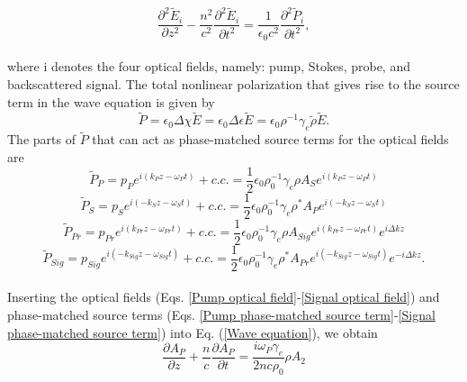 \documentclass[sn-nature]{sn-jnl}%
\begin{document}
\begin{equation}
    \frac{\partial^{2}\tilde{E}_{i}}{\partial z^{2}} - \frac{n^{2}}{c^{2}}\frac{\partial^{2}\tilde{E}_{i}}{\partial t^{2}} = \frac{1}{\epsilon_{0}c^{2}}\frac{\partial^{2}\tilde{P}_{i}}{\partial t^{2}},
    \label{Wave equation}
\end{equation}
\\
where i denotes the four optical fields, namely: pump, Stokes, probe, and backscattered signal. The total nonlinear polarization that gives rise to the source term in the wave equation is given by
\begin{equation}
    \tilde{P} = \epsilon_{0}\Delta\chi\tilde{E} = \epsilon_{0}\Delta\epsilon\tilde{E} = \epsilon_{0}\rho^{-1}\gamma_{e}\tilde{\rho}\tilde{E}.
\end{equation}
The parts of $\tilde{P}$ that can act as phase-matched source terms for the optical fields are
\begin{equation}
    \tilde{P}_{P} = p_{P}e^{i(k_{P}z - \omega_{P} t)} + c.c. = \frac{1}{2}\epsilon_{0}\rho_{0}^{-1}\gamma_{e}\rho A_{S}e^{i(k_{P}z - \omega_{P} t)}
    \label{Pump phase-matched source term}
\end{equation}
\begin{equation}
    \tilde{P}_{S} = p_{S}e^{i(-k_{S}z - \omega_{S} t)} + c.c. = \frac{1}{2}\epsilon_{0}\rho_{0}^{-1}\gamma_{e}\rho^{*} A_{P}e^{i(-k_{S}z - \omega_{S} t)}
    \label{Stokes phase-matched source term}
\end{equation}
\begin{equation}
    \tilde{P}_{Pr} = p_{Pr}e^{i(k_{Pr}z - \omega_{Pr} t)} + c.c. = \frac{1}{2}\epsilon_{0}\rho_{0}^{-1}\gamma_{e}\rho A_{Sig}e^{i(k_{Pr}z - \omega_{Pr} t)}e^{i\Delta kz}
    \label{Probe phase-matched source term}
\end{equation}
\begin{equation}
    \tilde{P}_{Sig} = p_{Sig}e^{i(-k_{Sig}z - \omega_{Sig} t)} + c.c. = \frac{1}{2}\epsilon_{0}\rho_{0}^{-1}\gamma_{e}\rho^{*} A_{Pr}e^{i(-k_{Sig}z - \omega_{Sig} t)}e^{-i\Delta kz}.
    \label{Signal phase-matched source term}
\end{equation}
\\
Inserting the optical fields (Eqs. \ref{Pump optical field}-\ref{Signal optical field}) and phase-matched source terms (Eqs. \ref{Pump phase-matched source term}-\ref{Signal phase-matched source term}) into Eq. (\ref{Wave equation}), we obtain
\begin{equation}
    \frac{\partial A_{P}}{\partial z} + \frac{n}{c}\frac{\partial A_{P}}{\partial t} = \frac{i\omega_{P}\gamma_{e}}{2nc\rho_{0}}\rho A_{2}
\end{equation}
\end{document}

